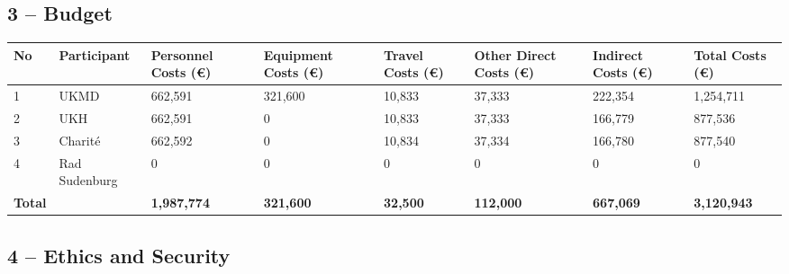 \documentclass[11pt, a4paper]{article}
\begin{document}
\subsection*{3 – Budget}

\begin{tabular}{p{} p{} p{} p{} p{} p{} p{} p{}}
\toprule
\textbf{No} & \textbf{Participant} & \textbf{Personnel Costs (€)} & \textbf{Equipment Costs (€)} & \textbf{Travel Costs (€)} & \textbf{Other Direct Costs (€)} & \textbf{Indirect Costs (€)} & \textbf{Total Costs (€)} \\
\midrule
1 & UKMD & 662,591 & 321,600 & 10,833 & 37,333 & 222,354 & 1,254,711 \\
2 & UKH & 662,591 & 0 & 10,833 & 37,333 & 166,779 & 877,536 \\
3 & Charité & 662,592 & 0 & 10,834 & 37,334 & 166,780 & 877,540 \\
4 & Rad Sudenburg & 0 & 0 & 0 & 0 & 0 & 0 \\
\midrule
\textbf{Total} & & \textbf{1,987,774} & \textbf{321,600} & \textbf{32,500} & \textbf{112,000} & \textbf{667,069} & \textbf{3,120,943} \\
\bottomrule
\end{tabular}

\subsection*{4 – Ethics and Security}
\end{document}
